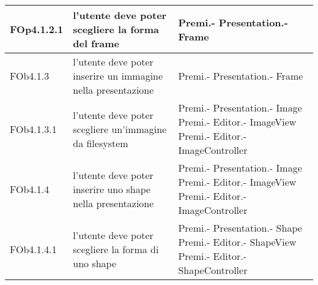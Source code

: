 \begin{longtable}{|l|p{5cm}|p{4cm}|}
\hline
FOp4.1.2.1 & l'utente deve poter scegliere la forma del frame & Premi.- \linebreak Presentation.- \linebreak Frame \linebreak \\
\hline
FOb4.1.3 & l'utente deve poter inserire un immagine nella presentazione & Premi.- \linebreak Presentation.- \linebreak Frame \linebreak \\
\hline
FOb4.1.3.1 & l'utente deve poter scegliere un'immagine da filesystem & Premi.- \linebreak Presentation.- \linebreak Image \linebreak Premi.- \linebreak Editor.- \linebreak ImageView \linebreak Premi.- \linebreak Editor.- \linebreak ImageController \linebreak \\
\hline
FOb4.1.4 & l'utente deve poter inserire uno shape nella presentazione & Premi.- \linebreak Presentation.- \linebreak Image \linebreak Premi.- \linebreak Editor.- \linebreak ImageView \linebreak Premi.- \linebreak Editor.- \linebreak ImageController \linebreak \\
\hline
FOb4.1.4.1 & l'utente deve poter scegliere la forma di uno shape & Premi.- \linebreak Presentation.- \linebreak Shape \linebreak Premi.- \linebreak Editor.- \linebreak ShapeView \linebreak Premi.- \linebreak Editor.- \linebreak ShapeController \linebreak \\

\end{longtable}
